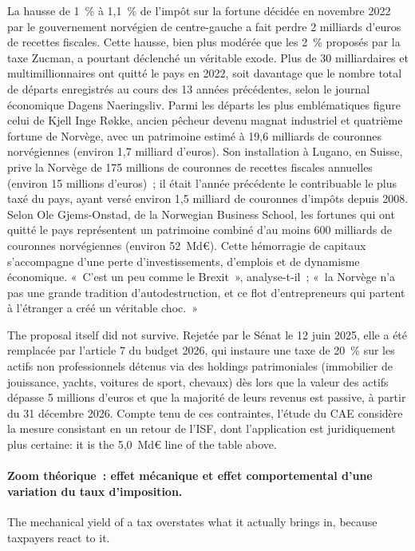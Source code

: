 \begin{example}
  La hausse de 1~\% à 1,1~\% de l'impôt sur la fortune décidée en novembre 2022
  par le gouvernement norvégien de centre-gauche a fait perdre 2 milliards
  d'euros de recettes fiscales. Cette hausse, bien plus modérée que les 2~\%
  proposés par la taxe Zucman, a pourtant déclenché un véritable exode. Plus de
  30 milliardaires et multimillionnaires ont quitté le pays en 2022, soit
  davantage que le nombre total de départs enregistrés au cours des 13 années
  précédentes, selon le journal économique Dagens Naeringsliv. Parmi les départs
  les plus emblématiques figure celui de Kjell Inge Røkke, ancien pêcheur devenu
  magnat industriel et quatrième fortune de Norvège, avec un patrimoine estimé à
  19,6 milliards de couronnes norvégiennes (environ 1,7 milliard d'euros). Son
  installation à Lugano, en Suisse, prive la Norvège de 175 millions de couronnes
  de recettes fiscales annuelles (environ 15 millions d'euros)~; il était
  l'année précédente le contribuable le plus taxé du pays, ayant versé environ
  1,5 milliard de couronnes d'impôts depuis 2008. Selon Ole Gjems-Onstad, de la Norwegian Business
  School, les fortunes qui ont quitté le pays représentent un
  patrimoine combiné d'au moins 600 milliards de couronnes norvégiennes (environ
  52~Md€). Cette hémorragie de capitaux s'accompagne d'une perte
  d'investissements, d'emplois et de dynamisme économique. «~C'est un peu comme
  le Brexit~», analyse-t-il~; «~la Norvège n'a pas une grande tradition
  d'autodestruction, et ce flot d'entrepreneurs qui partent à l'étranger a créé
  un véritable choc.~»
\end{example}

The proposal itself did not survive. Rejetée par le Sénat le 12 juin 2025, elle
a été remplacée par l'article 7 du budget 2026, qui instaure une taxe de 20~\%
sur les actifs non professionnels détenus via des holdings patrimoniales
(immobilier de jouissance, yachts, voitures de sport, chevaux) dès lors que la
valeur des actifs dépasse 5 millions d'euros et que la majorité de leurs
revenus est passive, à partir du 31 décembre 2026. Compte tenu de ces
contraintes, l'étude du CAE considère la mesure consistant en un retour de
l'ISF, dont l'application est juridiquement plus certaine: it is the 5,0~Md€
line of the table above.

\paragraph{Zoom théorique~: effet mécanique et effet comportemental d'une variation du taux d'imposition.}
The mechanical yield of a tax overstates what it actually brings in, because
taxpayers react to it.

